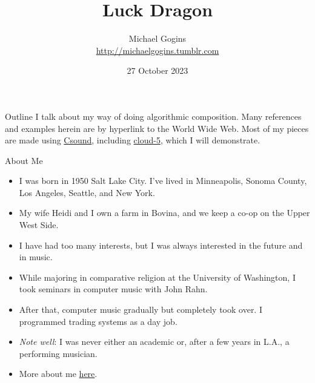 \documentclass{beamer}
\title[Luck Dragon] %
{Luck Dragon}
\author[Gogins] %
{Michael Gogins \\ \url{http://michaelgogins.tumblr.com} }
\institute[Irreducible Productions] %
{
  Irreducible Productions\\
  New York
}
\date[27 October 2023] %
{27 October 2023}
\begin{document}

\begin{frame}
  \titlepage
\end{frame}

\begin{frame}{Outline}
	I talk about my way of doing algorithmic composition. Many references and examples herein are by hyperlink to the World Wide Web. Most of my pieces are made using \href{http://csound.github.io/}{Csound}, including \href{https://gogins.github.io/}{cloud-5}, which I will demonstrate.
  \tableofcontents
\end{frame}

\begin{frame}{About Me}

\begin{itemize}
\item I was born in 1950 Salt Lake City. I've lived in Minneapolis, Sonoma County, Los Angeles, Seattle, and New York.
\item My wife Heidi and I own a farm in Bovina, and we keep a co-op on the Upper West Side.
\item I have had too many interests, but I was always interested in the future and in music.
\item While majoring in comparative religion at the University of Washington, I took seminars in computer music with John Rahn.
\item After that, computer music gradually but completely took over. I programmed trading systems as a day job.
\item \emph{Note well}: I was never either an academic or, after a few years in L.A., a performing musician.
\item More about me \href{https://michaelgogins.tumblr.com/}{here}.
\end{itemize}

\end{frame}
\end{document}
